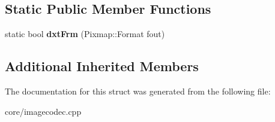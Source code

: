 \subsection*{Static Public Member Functions}
\begin{DoxyCompactItemize}
\item 
\hypertarget{struct_tempest_1_1_s3_t_c_codec_a4dc4fefab34dd23766225ea6a6f6a5af}{static bool {\bfseries dxt\+Frm} (Pixmap\+::\+Format fout)}\label{struct_tempest_1_1_s3_t_c_codec_a4dc4fefab34dd23766225ea6a6f6a5af}

\end{DoxyCompactItemize}
\subsection*{Additional Inherited Members}


The documentation for this struct was generated from the following file\+:\begin{DoxyCompactItemize}
\item 
core/imagecodec.\+cpp\end{DoxyCompactItemize}
